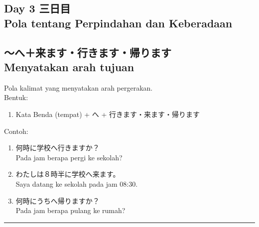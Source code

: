 \begin{flushright}
    \section*{\Large{Day 3 三日目 \\
    Pola tentang Perpindahan dan Keberadaan}}
\end{flushright}

\subsection*{
    ～へ＋来ます・行きます・帰ります \\ 
    Menyatakan arah tujuan
}
Pola kalimat yang menyatakan arah pergerakan.\\
Bentuk:
\begin{enumerate}
    \item Kata Benda (tempat) + へ + 行きます・来ます・帰ります
\end{enumerate}
Contoh: 
\begin{enumerate}
    \item 何時に学校へ行きますか？
    \\ Pada jam berapa pergi ke sekolah?
    \item わたしは８時半に学校へ来ます。
    \\ Saya datang ke sekolah pada jam 08:30.
    \item 何時にうちへ帰りますか？
    \\ Pada jam berapa pulang ke rumah?
\end{enumerate}

\vspace{0.2cm}\hrule height 1pt\vspace{0.2cm}


